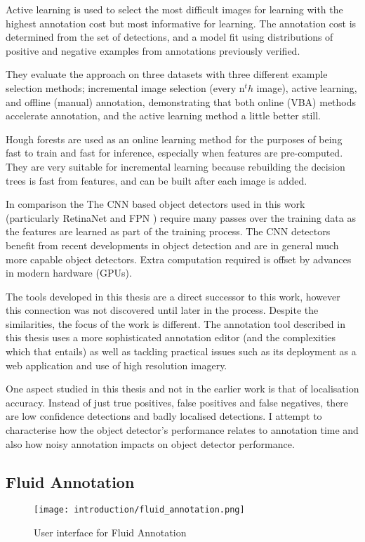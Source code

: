 Active learning is used to select the most difficult images for learning with the highest annotation cost but most informative for learning. The annotation cost is determined from the set of detections, and a model fit using distributions of positive and negative examples from annotations previously verified. 

They evaluate the approach on  three datasets with three different example selection methods; incremental image selection (every n$^th$ image), active learning, and offline (manual) annotation, demonstrating that both online (\gls{VBA}) methods accelerate annotation, and the active learning method a little better still.

Hough forests \cite{Gall2011} are used as an online learning method for the purposes of being fast to train and fast for inference, especially when features are pre-computed. They are very suitable for incremental learning because rebuilding the decision trees is fast from features, and can be built after each image is added. 

In comparison the The \gls{CNN} based object detectors used in this work (particularly RetinaNet \cite{Lin2017} and \gls{FPN} \cite{Lin2017a}) require many passes over the training data as the features are learned as part of the training process. The \gls{CNN} detectors benefit from recent developments in object detection and are in general much more capable object detectors. Extra computation required is offset by advances in modern hardware (\gls{GPU}s).

The tools developed in this thesis are a direct successor to this work, however this connection was not discovered until later in the process. 
Despite the similarities, the focus of the work is different. The annotation tool described in this thesis uses a more sophisticated annotation editor (and the complexities which that entails) as well as tackling practical issues such as its deployment as a web application and use of high resolution imagery.

One aspect studied in this thesis and not in the earlier work is that of localisation accuracy. Instead of just true positives, false positives and false negatives, there are low confidence detections and badly localised detections. I attempt to characterise how the object detector's performance relates to annotation time and also how noisy annotation impacts on object detector performance.


\subsection{Fluid Annotation \cite{Andriluka2018}}
\begin{figure}[h]
  \centering
  \texttt{[image: introduction/fluid\_annotation.png]}
  \caption{User interface for Fluid Annotation \cite{Andriluka2018}}  
  \label{fig:fluid_annotation}
\end{figure}

